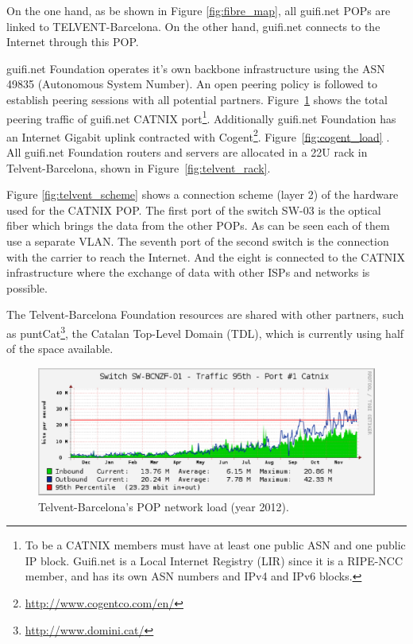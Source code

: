 On the one hand, as be shown in Figure \ref{fig:fibre_map}, all guifi.net POPs are linked to TELVENT-Barcelona. On the other hand, guifi.net connects to the Internet through this POP.

guifi.net Foundation operates it's own backbone infrastructure using the ASN 49835 (Autonomous System Number). 
An open peering policy is followed to establish peering sessions with all potential partners. Figure~\ref{fig:catnix_net_load} shows the total peering traffic of guifi.net CATNIX port\footnote{To be a CATNIX members must have at least one public ASN and one public IP block. Guifi.net is a Local Internet Registry (LIR) since it is a RIPE-NCC member, and has its own ASN numbers and IPv4 and IPv6 blocks.}. Additionally guifi.net Foundation has an Internet Gigabit uplink contracted with Cogent\footnote{\url{http://www.cogentco.com/en/}}. Figure~\ref{fig:cogent_load} . All guifi.net Foundation routers and servers are allocated in a 22U rack in Telvent-Barcelona, shown in Figure~\ref{fig:telvent_rack}. 


Figure \ref{fig:telvent_scheme} shows a connection scheme (layer 2) of the hardware used for the CATNIX POP. 
The first port of the switch SW-03 is the optical fiber which brings the data from the other POPs. As can be seen each
of them use a separate VLAN. The seventh port of the second switch is the connection with the carrier to reach the Internet.
And the eight is connected to the CATNIX infrastructure where the exchange of data with other ISPs and networks is possible. 


The Telvent-Barcelona Foundation resources are shared with other partners, such as puntCat\footnote{\url{http://www.domini.cat/}}, the Catalan Top-Level Domain (TDL), which is currently using half of the space available.

\begin{figure}[htbp]
  \centering
  \includegraphics[scale=.65]{sect3/figures/catnix_network_load_year.eps} 
  \caption{Telvent-Barcelona's POP network load (year 2012).}
  \label{fig:catnix_net_load}
\end{figure}


